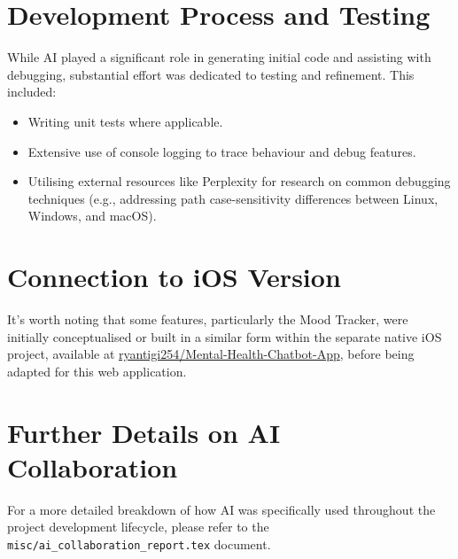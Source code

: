 \documentclass{article}
\begin{document}
\section*{Development Process and Testing}
While AI played a significant role in generating initial code and assisting with debugging, substantial effort was dedicated to testing and refinement. This included:
\begin{itemize}
    \item Writing unit tests where applicable.
    \item Extensive use of console logging to trace behaviour and debug features.
    \item Utilising external resources like Perplexity for research on common debugging techniques (e.g., addressing path case-sensitivity differences between Linux, Windows, and macOS).
\end{itemize}

\section*{Connection to iOS Version}
It's worth noting that some features, particularly the Mood Tracker, were initially conceptualised or built in a similar form within the separate native iOS project, available at \href{https://github.com/ryantigi254/Mental-Health-Chatbot-App}{ryantigi254/Mental-Health-Chatbot-App}, before being adapted for this web application.

\section*{Further Details on AI Collaboration}
For a more detailed breakdown of how AI was specifically used throughout the project development lifecycle, please refer to the \texttt{misc/ai\_collaboration\_report.tex} document.
\end{document}
